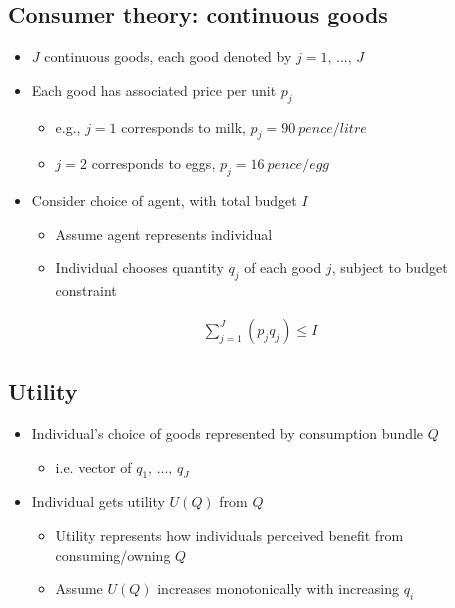 \documentclass[class=report, crop=false, 12pt,a4paper]{standalone}
\begin{document}
\subsection{Consumer theory: continuous goods}
\begin{itemize}
	\item $J$ continuous goods, each good denoted by $j = 1, \, ..., \, J$
	\item Each good has associated price per unit $p_j$
	      \begin{itemize}
		      \item e.g., $j = 1$ corresponds to milk, $p_j = \SI{90}{pence\per litre}$
		      \item $j = 2$ corresponds to eggs, $p_j = \SI{16}{pence \per egg}$
	      \end{itemize}
	\item Consider choice of agent, with total budget $I$
	      \begin{itemize}
		      \item Assume agent represents individual
		      \item Individual chooses quantity $q_j$ of each good $j$, subject to budget constraint
	      \end{itemize}
\end{itemize}
\begin{gather}
	\sum_{j=1}^{J} \left(p_jq_j\right) \leq I
\end{gather}
\subsection{Utility}
\begin{itemize}
	\item Individual's choice of goods represented by consumption bundle $Q$
	      \begin{itemize}
		      \item i.e. vector of $q_1, \, ..., \, q_J$
	      \end{itemize}
	\item Individual gets utility $U\left(Q\right)$ from $Q$
	      \begin{itemize}
		      \item Utility represents how individuals perceived benefit from consuming/owning $Q$
		      \item Assume $U\left(Q\right)$ increases monotonically with increasing $q_i$
	      \end{itemize}
\end{itemize}
\end{document}
